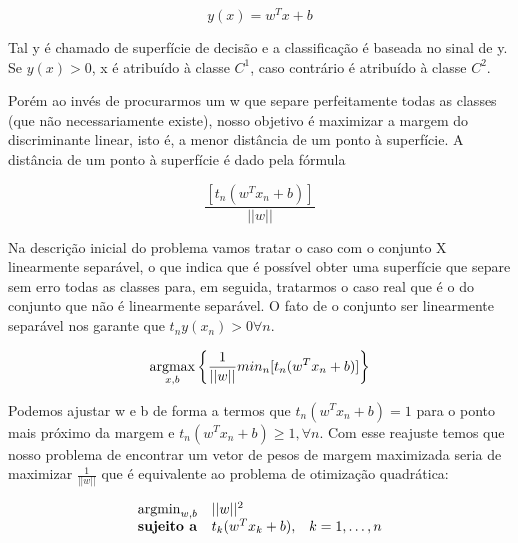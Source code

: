 \begin{center}
	\begin{equation}\label{eq:svm-discriminant}
		y(x) = w^Tx + b
	\end{equation}
\end{center}

Tal y é chamado de superfície de decisão e a classificação é baseada no sinal de
y. Se $y(x) > 0$, x é atribuído à classe $C^1$, caso contrário é atribuído à classe
$C^2$.

Porém ao invés de procurarmos um w que separe perfeitamente todas as classes (que
não necessariamente existe), nosso objetivo é maximizar a margem do discriminante
linear, isto é, a menor distância de um ponto à superfície. A distância de um ponto à
superfície é dado pela fórmula

\begin{center}
	\begin{equation}
		\frac{[t_n(w^Tx_n + b)]}{||w||}
	\end{equation}
\end{center}
 
Na descrição inicial do problema vamos tratar o caso com o conjunto X linearmente separável, 
o que indica que é possível obter uma superfície que separe sem erro todas as classes para, em
seguida, tratarmos o caso real que é o do conjunto que não é linearmente separável.
O fato de o conjunto ser linearmente separável nos garante que $t_ny(x_n) >0 \forall n$.


\begin{center}
	\begin{equation}
		\operatorname*{argmax}_{x, b} \left\{ \frac{1}{||w||} min_n [t_n(w^Tx_n + b)] \right\}
	\end{equation}
\end{center}


Podemos ajustar w e b de forma a termos que $t_n(w^Tx_n + b) = 1$ para o ponto mais
próximo da margem e $t_n(w^Tx_n + b) \ge 1, \forall n$. Com esse reajuste temos que nosso
problema de encontrar um vetor de pesos de margem maximizada seria de maximizar 
$\frac{1}{||w||}$ que é equivalente ao problema de otimização quadrática:

\begin{center}
	\begin{equation}
		\begin{array}{ll@{}ll}
				\argmin_{w, b} & ||w||^2 &\\
				\textbf{sujeito a}& t_k(w^Tx_k + b), &&k = 1, \ldots ,n 
		\end{array}
	\end{equation}
\end{center}

